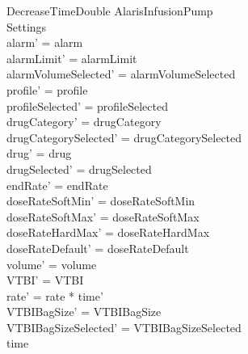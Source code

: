 \begin{schema}{DecreaseTimeDouble}
	\Delta AlarisInfusionPump\\
	 Settings\\
	\where
	alarm' = alarm\\
	alarmLimit' = alarmLimit\\
	alarmVolumeSelected' = alarmVolumeSelected\\
	profile' = profile\\
	\pagebreak
	profileSelected' = profileSelected\\
	drugCategory' = drugCategory\\ 
	drugCategorySelected' = drugCategorySelected\\
	drug' = drug\\ 
	drugSelected' = drugSelected\\
	endRate' = endRate\\
	doseRateSoftMin' = doseRateSoftMin\\
	doseRateSoftMax' = doseRateSoftMax\\
	doseRateHardMax' = doseRateHardMax\\
	doseRateDefault' = doseRateDefault\\
	volume' = volume\\
	VTBI' = VTBI\\
	rate' = rate * time'\\
	VTBIBagSize' = VTBIBagSize\\ 
	VTBIBagSizeSelected' = VTBIBagSizeSelected\\
	time \\

\end{schema}
